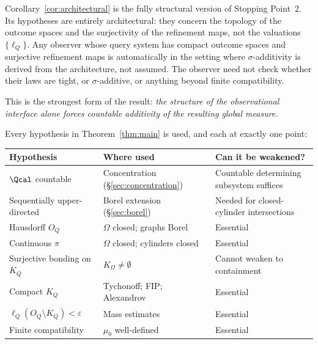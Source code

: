 \begin{remark}
Corollary~\ref{cor:architectural} is the fully structural version
of Stopping Point~2.  Its hypotheses are entirely architectural:
they concern the topology of the outcome spaces and the surjectivity
of the refinement maps, not the valuations $\{\ell_Q\}$.  Any
observer whose query system has compact outcome spaces and surjective
refinement maps is automatically in the setting where
$\sigma$-additivity is derived from the architecture, not assumed.
The observer need not check whether their laws are tight, or
$\sigma$-additive, or anything beyond finite compatibility.

This is the strongest form of the result: \emph{the structure of
the observational interface alone forces countable additivity of the
resulting global measure.}
\end{remark}

\begin{remark}
Every hypothesis in Theorem~\ref{thm:main} is used, and each
at exactly one point:

\begin{center}
\begin{tabular}{llp{5cm}}
\toprule
Hypothesis & Where used & Can it be weakened? \\
\midrule
$\Qcal$ countable & Concentration (\S\ref{sec:concentration})
  & Countable determining subsystem suffices \\
Sequentially upper-directed & Borel extension (\S\ref{sec:borel})
  & Needed for closed-cylinder intersections \\
Hausdorff $O_Q$ & $\Omega$ closed; graphs Borel
  & Essential \\
Continuous $\pi$ & $\Omega$ closed; cylinders closed
  & Essential \\
Surjective bonding on $K_Q$ & $K_\Omega \neq \emptyset$
  & Cannot weaken to containment \\
Compact $K_Q$ & Tychonoff; FIP; Alexandrov
  & Essential \\
$\ell_Q(O_Q \setminus K_Q) < \varepsilon$ & Mass estimates
  & Essential \\
Finite compatibility & $\mu_0$ well-defined
  & Essential \\
\bottomrule
\end{tabular}
\end{center}
\end{remark}

